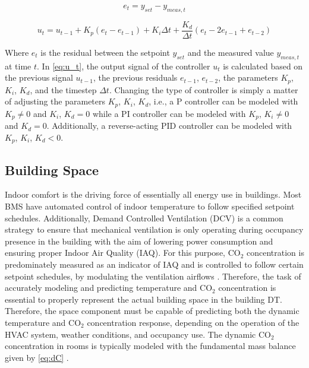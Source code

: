\begin{equation}
   e_t = y_{set}-y_{meas,t}
   \label{eq:e_t}
\end{equation}

\begin{equation}
   u_t = u_{t-1} + K_p (e_t-e_{t-1}) + K_i \Delta t +  \frac{K_d}{\Delta t} \left(e_t -2e_{t-1} + e_{t-2} \right)
   \label{eq:u_t}
\end{equation}


Where $e_t$ is the residual between the setpoint $y_{set}$ and the measured value $y_{meas,t}$ at time $t$. In \autoref{eq:u_t}, the output signal of the controller $u_t$ is calculated based on the previous signal $u_{t-1}$, the previous residuals $e_{t-1}$, $e_{t-2}$, the parameters $K_p$, $K_i$, $K_d$, and the timestep $\Delta t$. Changing the type of controller is simply a matter of adjusting the parameters $K_p$, $K_i$, $K_d$, i.e., a P controller can be modeled with $K_p \neq 0$ and $K_i$, $K_d=0$ while a PI controller can be modeled with $K_p$, $K_i \neq 0$ and $K_d=0$. Additionally, a reverse-acting PID controller can be modeled with $K_p$, $K_i$, $K_d<0$. 




\subsection{Building Space}

Indoor comfort is the driving force of essentially all energy use in buildings. Most BMS have automated control of indoor temperature to follow specified setpoint schedules. Additionally, Demand Controlled Ventilation (DCV) is a common strategy to ensure that mechanical ventilation is only operating during occupancy presence in the building with the aim of lowering power consumption and ensuring proper Indoor Air Quality (IAQ). For this purpose, CO$_2$ concentration is predominately measured as an indicator of IAQ and is controlled to follow certain setpoint schedules, by modulating the ventilation airflows \cite{MEREMA2018349}. Therefore, the task of accurately modeling and predicting temperature and CO$_2$ concentration is essential to properly represent the actual building space in the building DT. Therefore, the space component must be capable of predicting both the dynamic temperature and CO$_2$ concentration response, depending on the operation of the HVAC system, weather conditions, and occupancy use. The dynamic CO$_2$ concentration in rooms is typically modeled with the fundamental mass balance given by \autoref{eq:dC} \cite{Macarulla2017,PANTAZARAS2016774}.

